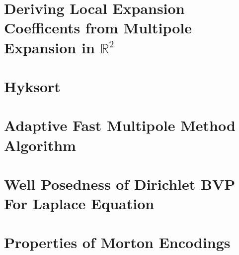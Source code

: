 
\chapter{Deriving Local Expansion Coefficents from Multipole Expansion in $\mathbb{R}^2$}\label{app:locals}


\chapter{Hyksort}\label{app:hyksort}


\chapter{Adaptive Fast Multipole Method Algorithm}\label{app:adaptive_fmm}


\chapter{Well Posedness of Dirichlet BVP For Laplace Equation}\label{app:laplace_bvp}


\chapter{Properties of Morton Encodings}\label{app:morton}

